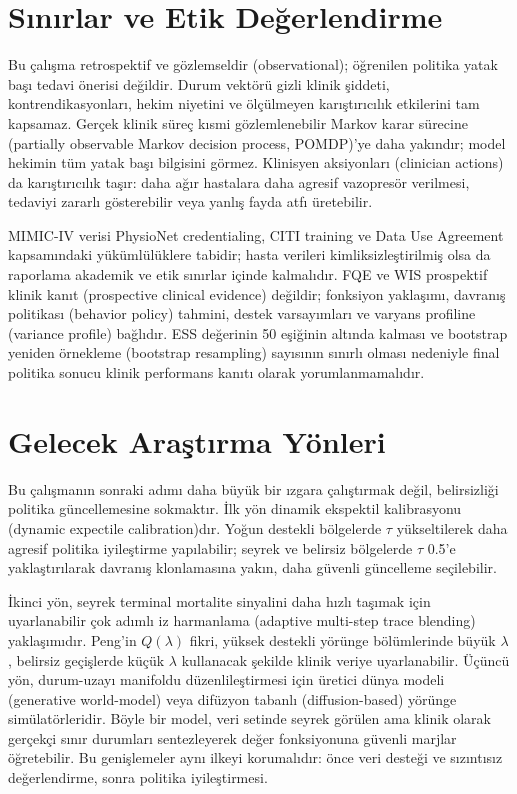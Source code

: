 \documentclass[conference]{IEEEtran}
\begin{document}
\section{Sınırlar ve Etik Değerlendirme}
Bu çalışma retrospektif ve gözlemseldir (observational); öğrenilen politika yatak başı tedavi önerisi değildir. Durum vektörü gizli klinik şiddeti, kontrendikasyonları, hekim niyetini ve ölçülmeyen karıştırıcılık etkilerini tam kapsamaz. Gerçek klinik süreç kısmi gözlemlenebilir Markov karar sürecine (partially observable Markov decision process, POMDP)'ye daha yakındır; model hekimin tüm yatak başı bilgisini görmez. Klinisyen aksiyonları (clinician actions) da karıştırıcılık taşır: daha ağır hastalara daha agresif vazopresör verilmesi, tedaviyi zararlı gösterebilir veya yanlış fayda atfı üretebilir.

MIMIC-IV verisi PhysioNet credentialing, CITI training ve Data Use Agreement kapsamındaki yükümlülüklere tabidir; hasta verileri kimliksizleştirilmiş olsa da raporlama akademik ve etik sınırlar içinde kalmalıdır. FQE ve WIS prospektif klinik kanıt (prospective clinical evidence) değildir; fonksiyon yaklaşımı, davranış politikası (behavior policy) tahmini, destek varsayımları ve varyans profiline (variance profile) bağlıdır. ESS değerinin 50 eşiğinin altında kalması ve bootstrap yeniden örnekleme (bootstrap resampling) sayısının sınırlı olması nedeniyle final politika sonucu klinik performans kanıtı olarak yorumlanmamalıdır.

\section{Gelecek Araştırma Yönleri}
Bu çalışmanın sonraki adımı daha büyük bir ızgara çalıştırmak değil, belirsizliği politika güncellemesine sokmaktır. İlk yön dinamik ekspektil kalibrasyonu (dynamic expectile calibration)dır. Yoğun destekli bölgelerde $\tau$ yükseltilerek daha agresif politika iyileştirme yapılabilir; seyrek ve belirsiz bölgelerde $\tau$ 0.5'e yaklaştırılarak davranış klonlamasına yakın, daha güvenli güncelleme seçilebilir.

İkinci yön, seyrek terminal mortalite sinyalini daha hızlı taşımak için uyarlanabilir çok adımlı iz harmanlama (adaptive multi-step trace blending) yaklaşımıdır. Peng'in $Q(\lambda)$ fikri, yüksek destekli yörünge bölümlerinde büyük $\lambda$, belirsiz geçişlerde küçük $\lambda$ kullanacak şekilde klinik veriye uyarlanabilir. Üçüncü yön, durum-uzayı manifoldu düzenlileştirmesi için üretici dünya modeli (generative world-model) veya difüzyon tabanlı (diffusion-based) yörünge simülatörleridir. Böyle bir model, veri setinde seyrek görülen ama klinik olarak gerçekçi sınır durumları sentezleyerek değer fonksiyonuna güvenli marjlar öğretebilir. Bu genişlemeler aynı ilkeyi korumalıdır: önce veri desteği ve sızıntısız değerlendirme, sonra politika iyileştirmesi.
\end{document}
